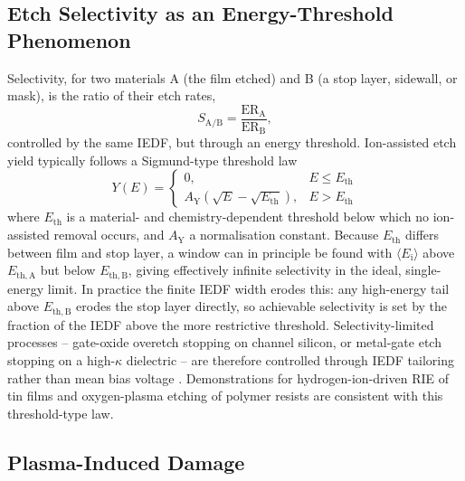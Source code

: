 \subsection{Etch Selectivity as an Energy-Threshold Phenomenon}

Selectivity, for two materials A (the film etched) and B (a stop layer, sidewall, or mask), is the ratio of their etch rates,
\begin{equation}
S_{\mathrm{A/B}} = \frac{\mathrm{ER}_{\mathrm{A}}}{\mathrm{ER}_{\mathrm{B}}},
\label{eq:etch_select}
\end{equation}
controlled by the same IEDF, but through an energy threshold. Ion-assisted etch yield typically follows a Sigmund-type threshold law
\begin{equation}
Y(E) =
\begin{cases}
0, & E \le E_{\mathrm{th}} \\
A_{\mathrm{Y}} \left( \sqrt{E} - \sqrt{E_{\mathrm{th}}} \right), & E > E_{\mathrm{th}}
\end{cases}
\label{eq:etch_yield}
\end{equation}
where $E_{\mathrm{th}}$ is a material- and chemistry-dependent threshold below which no ion-assisted removal occurs, and $A_{\mathrm{Y}}$ a normalisation constant. Because $E_{\mathrm{th}}$ differs between film and stop layer, a window can in principle be found with $\langle E_{\mathrm{i}} \rangle$ above $E_{\mathrm{th,A}}$ but below $E_{\mathrm{th,B}}$, giving effectively infinite selectivity in the ideal, single-energy limit. In practice the finite IEDF width erodes this: any high-energy tail above $E_{\mathrm{th,B}}$ erodes the stop layer directly, so achievable selectivity is set by the fraction of the IEDF above the more restrictive threshold. Selectivity-limited processes -- gate-oxide overetch stopping on channel silicon, or metal-gate etch stopping on a high-$\kappa$ dielectric -- are therefore controlled through IEDF tailoring rather than mean bias voltage \cite{ref0539,ref0541}. Demonstrations for hydrogen-ion-driven RIE of tin films and oxygen-plasma etching of polymer resists \cite{ref0532} are consistent with this threshold-type law.

\subsection{Plasma-Induced Damage}

